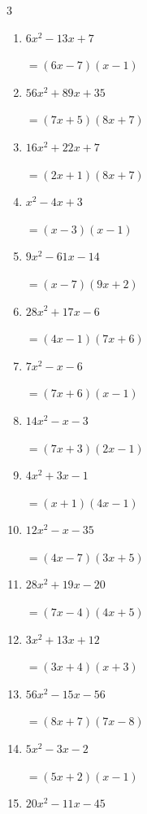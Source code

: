 \begin{multicols}{3}
\begin{enumerate}
\columnbreak %

\resetques

  \item $6x^{2}-13x+7$

        $=(6x-7)(x-1)$

  \item $56x^{2}+89x+35$

        $=(7x+5)(8x+7)$

  \item $16x^{2}+22x+7$

        $=(2x+1)(8x+7)$

  \item $x^{2}-4x+3$

        $=(x-3)(x-1)$

  \item $9x^{2}-61x-14$

        $=(x-7)(9x+2)$

  \item $28x^{2}+17x-6$

        $=(4x-1)(7x+6)$

  \item $7x^{2}-x-6$

        $=(7x+6)(x-1)$

  \item $14x^{2}-x-3$

        $=(7x+3)(2x-1)$

  \item $4x^{2}+3x-1$

        $=(x+1)(4x-1)$

  \item $12x^{2}-x-35$

        $=(4x-7)(3x+5)$

\columnbreak %

  \item $28x^{2}+19x-20$

        $=(7x-4)(4x+5)$

  \item $3x^{2}+13x+12$

        $=(3x+4)(x+3)$

  \item $56x^{2}-15x-56$

        $=(8x+7)(7x-8)$

  \item $5x^{2}-3x-2$

        $=(5x+2)(x-1)$

  \item $20x^{2}-11x-45$


\end{enumerate}
\end{multicols}
